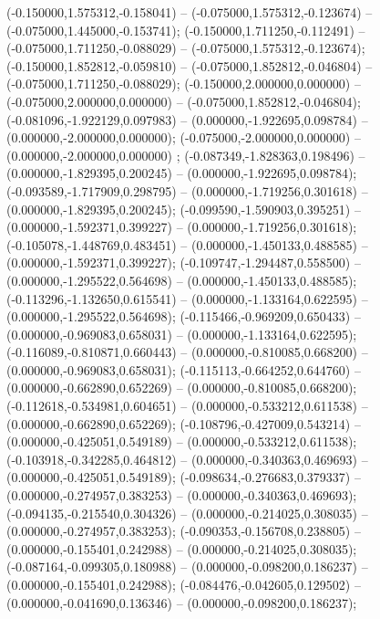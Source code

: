  (-0.150000,1.575312,-0.158041) -- (-0.075000,1.575312,-0.123674) -- (-0.075000,1.445000,-0.153741);
 (-0.150000,1.711250,-0.112491) -- (-0.075000,1.711250,-0.088029) -- (-0.075000,1.575312,-0.123674);
 (-0.150000,1.852812,-0.059810) -- (-0.075000,1.852812,-0.046804) -- (-0.075000,1.711250,-0.088029);
 (-0.150000,2.000000,0.000000) -- (-0.075000,2.000000,0.000000) -- (-0.075000,1.852812,-0.046804);
 (-0.081096,-1.922129,0.097983) -- (0.000000,-1.922695,0.098784) -- (0.000000,-2.000000,0.000000);
 (-0.075000,-2.000000,0.000000) -- (0.000000,-2.000000,0.000000) ;
 (-0.087349,-1.828363,0.198496) -- (0.000000,-1.829395,0.200245) -- (0.000000,-1.922695,0.098784);
 (-0.093589,-1.717909,0.298795) -- (0.000000,-1.719256,0.301618) -- (0.000000,-1.829395,0.200245);
 (-0.099590,-1.590903,0.395251) -- (0.000000,-1.592371,0.399227) -- (0.000000,-1.719256,0.301618);
 (-0.105078,-1.448769,0.483451) -- (0.000000,-1.450133,0.488585) -- (0.000000,-1.592371,0.399227);
 (-0.109747,-1.294487,0.558500) -- (0.000000,-1.295522,0.564698) -- (0.000000,-1.450133,0.488585);
 (-0.113296,-1.132650,0.615541) -- (0.000000,-1.133164,0.622595) -- (0.000000,-1.295522,0.564698);
 (-0.115466,-0.969209,0.650433) -- (0.000000,-0.969083,0.658031) -- (0.000000,-1.133164,0.622595);
 (-0.116089,-0.810871,0.660443) -- (0.000000,-0.810085,0.668200) -- (0.000000,-0.969083,0.658031);
 (-0.115113,-0.664252,0.644760) -- (0.000000,-0.662890,0.652269) -- (0.000000,-0.810085,0.668200);
 (-0.112618,-0.534981,0.604651) -- (0.000000,-0.533212,0.611538) -- (0.000000,-0.662890,0.652269);
 (-0.108796,-0.427009,0.543214) -- (0.000000,-0.425051,0.549189) -- (0.000000,-0.533212,0.611538);
 (-0.103918,-0.342285,0.464812) -- (0.000000,-0.340363,0.469693) -- (0.000000,-0.425051,0.549189);
 (-0.098634,-0.276683,0.379337) -- (0.000000,-0.274957,0.383253) -- (0.000000,-0.340363,0.469693);
 (-0.094135,-0.215540,0.304326) -- (0.000000,-0.214025,0.308035) -- (0.000000,-0.274957,0.383253);
 (-0.090353,-0.156708,0.238805) -- (0.000000,-0.155401,0.242988) -- (0.000000,-0.214025,0.308035);
 (-0.087164,-0.099305,0.180988) -- (0.000000,-0.098200,0.186237) -- (0.000000,-0.155401,0.242988);
 (-0.084476,-0.042605,0.129502) -- (0.000000,-0.041690,0.136346) -- (0.000000,-0.098200,0.186237);

